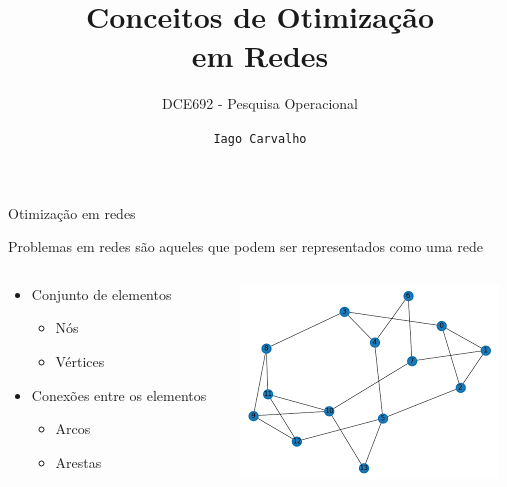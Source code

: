 \documentclass[compress,mathserif]{beamer}
\title{Conceitos de Otimização \\ em Redes}
\subtitle{DCE692 - Pesquisa Operacional}
\author{\texttt{Iago Carvalho}}
\institute{\texttt{Departamento de Ciência da Computação}}
\begin{document}
\begin{frame}
\titlepage

\end{frame}


\begin{frame}{Otimização em redes}

Problemas em redes são aqueles que podem ser representados como uma rede

\begin{columns}[T]
    \begin{column}{.44\textwidth}
        \begin{itemize}
            \item Conjunto de elementos
            \begin{itemize}
                \item Nós
                \item Vértices
            \end{itemize}
            \item Conexões entre os elementos
            \begin{itemize}
                \item Arcos
                \item Arestas
            \end{itemize}
        \end{itemize}
    \end{column}
    \begin{column}{.54\textwidth}
        \centering \includegraphics[width=\textwidth]{images/grafo.png}
    \end{column}
\end{columns}


\end{frame}
\end{document}
